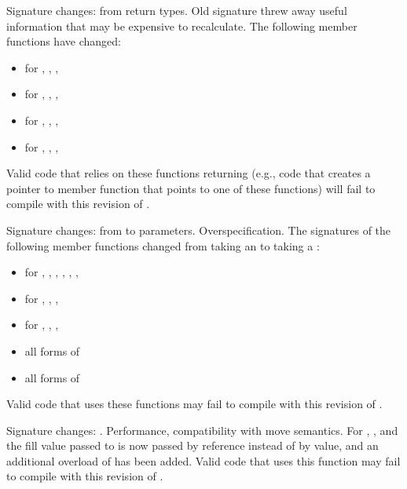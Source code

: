 \change
Signature changes: from  return types.
\rationale
Old signature threw away useful information that may be expensive
to recalculate.
\effect
The following member functions have changed:
\begin{itemize}
\item {} for , , , 
\item {} for , , , 
\item {} for , , , 
\item {} for , , , 
\end{itemize}

Valid \CppIII{} code that relies on these functions returning 
(e.g., code that creates a pointer to member function that points to one
of these functions) will fail to compile with this revision of \Cpp{}.

\change
Signature changes: from  to 
parameters.
\rationale
Overspecification.
\effect
The signatures of the following member functions changed from taking an
 to taking a :
\begin{itemize}
\item {} for , , ,
, , , 
\item {} for , , ,
\item {} for , , , 
\item all forms of 
\item all forms of 
\end{itemize}

Valid \CppIII{} code that uses these functions may fail to compile with this
revision of \Cpp{}.

\change
Signature changes: .
\rationale
Performance, compatibility with move semantics.
\effect
For , , and 
the fill value passed to  is now passed by reference instead of
by value, and an additional overload of  has been added. Valid
\CppIII{} code that uses this function may fail to compile with this revision of \Cpp{}.

